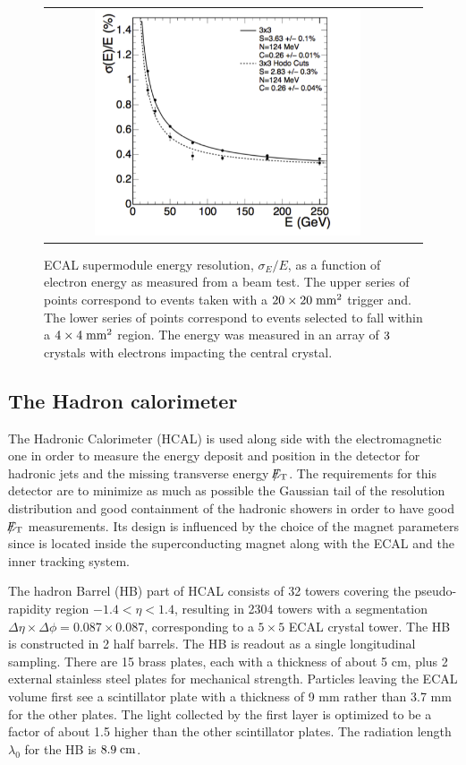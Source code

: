 \begin{figure}[tbh!]
	\centering
	\begin{tabular}{cc}
		\includegraphics[width=0.75\textwidth]{detector/pics/ECAL_resolution.pdf}
	\end{tabular}
	\caption{ECAL supermodule energy resolution, $\sigma_{E}/E$, as a function of electron energy as measured from a beam test. The upper series of points correspond to events taken with a $20\times20\;\text{mm}^{2}$ trigger and. The lower series of points correspond to events selected to fall within a $4\times4\;\text{mm}^{2}$ region. The energy was measured in an array of $3\time3$ crystals with electrons impacting the central crystal.}
	\label{fig:ECAL_resolution}
\end{figure}

\clearpage

\subsection{The Hadron calorimeter}

The Hadronic Calorimeter (HCAL) is used along side with the electromagnetic one in order to measure the energy deposit and position in the detector for hadronic jets and the missing transverse energy $\slash\mkern-12mu{E}_{\text{T}}$. The requirements for this detector are to minimize as much as possible the Gaussian tail of the resolution distribution and good containment of the hadronic showers in order to have good $\slash\mkern-12mu{E}_{\text{T}}$ measurements. Its design is influenced by the choice of the magnet parameters since is located inside the superconducting magnet along with the ECAL and the inner tracking system. 

The hadron Barrel (HB) part of HCAL consists of 32 towers covering the pseudo-rapidity region $−1.4 < \eta < 1.4$, resulting in 2304 towers with a segmentation $\Delta\eta\times\Delta\phi = 0.087\times0.087$, corresponding to a $5\times5$ ECAL crystal tower. The HB is constructed in 2 half barrels. The HB is readout as a single longitudinal sampling. There are 15 brass plates, each with a thickness of about 5 cm, plus 2 external stainless steel plates for mechanical strength. Particles leaving the ECAL volume first see a scintillator plate with a thickness of 9 mm rather than 3.7 mm for the other plates. The light collected by the first layer is optimized to be a factor of about 1.5 higher than the other scintillator plates. The radiation length $\lambda_{0}$ for the HB is $8.9\;\text{cm}$.

